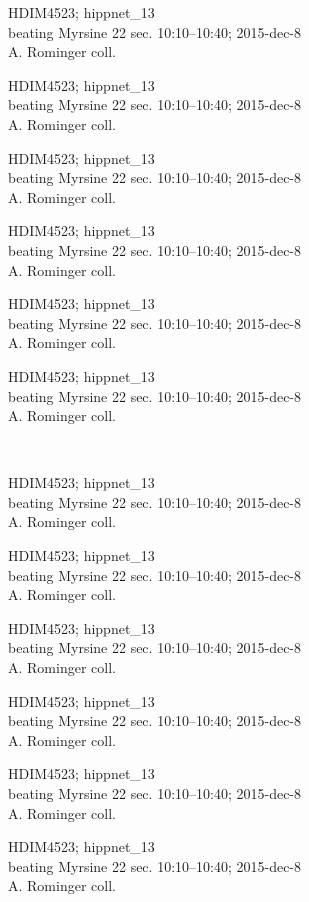 \documentclass[2pt]{extarticle}
\begin{document}
\noindent
\parbox{0.16\textwidth}{\tiny \raggedright \rule[-0.3\baselineskip]{0pt}{10pt}HDIM4523; hippnet\_13\\ beating Myrsine 22 sec. 10:10--10:40; 2015-dec-8\\ A. Rominger coll.}
\parbox{0.16\textwidth}{\tiny \raggedright \rule[-0.3\baselineskip]{0pt}{10pt}HDIM4523; hippnet\_13\\ beating Myrsine 22 sec. 10:10--10:40; 2015-dec-8\\ A. Rominger coll.}
\parbox{0.16\textwidth}{\tiny \raggedright \rule[-0.3\baselineskip]{0pt}{10pt}HDIM4523; hippnet\_13\\ beating Myrsine 22 sec. 10:10--10:40; 2015-dec-8\\ A. Rominger coll.}
\parbox{0.16\textwidth}{\tiny \raggedright \rule[-0.3\baselineskip]{0pt}{10pt}HDIM4523; hippnet\_13\\ beating Myrsine 22 sec. 10:10--10:40; 2015-dec-8\\ A. Rominger coll.}
\parbox{0.16\textwidth}{\tiny \raggedright \rule[-0.3\baselineskip]{0pt}{10pt}HDIM4523; hippnet\_13\\ beating Myrsine 22 sec. 10:10--10:40; 2015-dec-8\\ A. Rominger coll.}
\parbox{0.16\textwidth}{\tiny \raggedright \rule[-0.3\baselineskip]{0pt}{10pt}HDIM4523; hippnet\_13\\ beating Myrsine 22 sec. 10:10--10:40; 2015-dec-8\\ A. Rominger coll.} \\ 
\vspace{0.001in} 

\noindent
\parbox{0.16\textwidth}{\tiny \raggedright \rule[-0.3\baselineskip]{0pt}{10pt}HDIM4523; hippnet\_13\\ beating Myrsine 22 sec. 10:10--10:40; 2015-dec-8\\ A. Rominger coll.}
\parbox{0.16\textwidth}{\tiny \raggedright \rule[-0.3\baselineskip]{0pt}{10pt}HDIM4523; hippnet\_13\\ beating Myrsine 22 sec. 10:10--10:40; 2015-dec-8\\ A. Rominger coll.}
\parbox{0.16\textwidth}{\tiny \raggedright \rule[-0.3\baselineskip]{0pt}{10pt}HDIM4523; hippnet\_13\\ beating Myrsine 22 sec. 10:10--10:40; 2015-dec-8\\ A. Rominger coll.}
\parbox{0.16\textwidth}{\tiny \raggedright \rule[-0.3\baselineskip]{0pt}{10pt}HDIM4523; hippnet\_13\\ beating Myrsine 22 sec. 10:10--10:40; 2015-dec-8\\ A. Rominger coll.}
\parbox{0.16\textwidth}{\tiny \raggedright \rule[-0.3\baselineskip]{0pt}{10pt}HDIM4523; hippnet\_13\\ beating Myrsine 22 sec. 10:10--10:40; 2015-dec-8\\ A. Rominger coll.}
\parbox{0.16\textwidth}{\tiny \raggedright \rule[-0.3\baselineskip]{0pt}{10pt}HDIM4523; hippnet\_13\\ beating Myrsine 22 sec. 10:10--10:40; 2015-dec-8\\ A. Rominger coll.} \\ 
\vspace{0.001in} 
\end{document}
